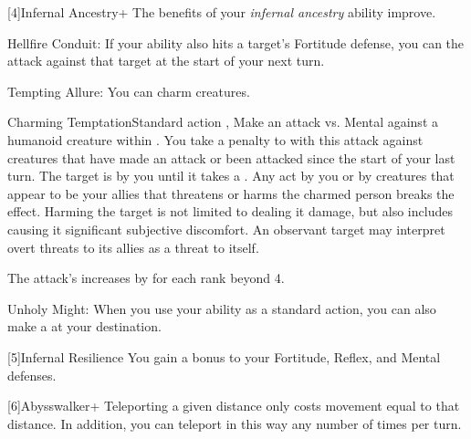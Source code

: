     [4]{Infernal Ancestry+} The benefits of your \textit{infernal ancestry} ability improve.
      \begin{raggeditemize}
        \item Hellfire Conduit: If your  ability also hits a target's Fortitude defense, you can  the attack against that target at the start of your next turn.
        \item Tempting Allure: You can charm creatures.
          \begin{magicalactiveability}{Charming Temptation}{Standard action}
            \abilitytags {}, 
            \rankline
            Make an attack vs. Mental against a humanoid creature within \medrange.
            You take a  penalty to  with this attack against creatures that have made an attack or been attacked since the start of your last turn.
            \hit The target is \charmed by you until it takes a .
            Any act by you or by creatures that appear to be your allies that threatens or harms the charmed person breaks the effect.
            Harming the target is not limited to dealing it damage, but also includes causing it significant subjective discomfort.
            An observant target may interpret overt threats to its allies as a threat to itself.

            \rankline
            The attack's  increases by  for each rank beyond 4.
          \end{magicalactiveability}
        \item Unholy Might: When you use your  ability as a standard action, you can also make a   at your destination.
      \end{raggeditemize}

    [5]{Infernal Resilience} You gain a  bonus to your Fortitude, Reflex, and Mental defenses.

    [6]{Abysswalker+} Teleporting a given distance only costs movement equal to that distance.
    In addition, you can teleport in this way any number of times per turn.

